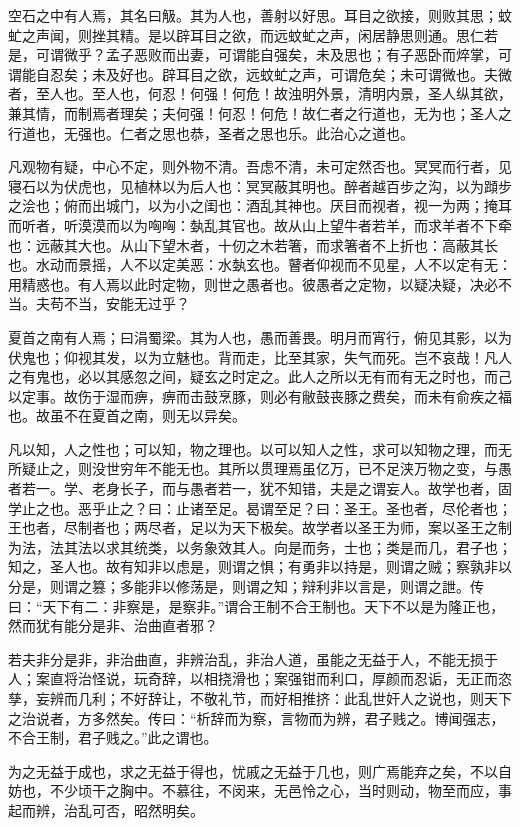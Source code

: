 \documentclass[]{article}
\begin{document}
空石之中有人焉，其名曰觙。其为人也，善射以好思。耳目之欲接，则败其思；蚊虻之声闻，则挫其精。是以辟耳目之欲，而远蚊虻之声，闲居静思则通。思仁若是，可谓微乎？孟子恶败而出妻，可谓能自强矣，未及思也；有子恶卧而焠掌，可谓能自忍矣；未及好也。辟耳目之欲，远蚊虻之声，可谓危矣；未可谓微也。夫微者，至人也。至人也，何忍！何强！何危！故浊明外景，清明内景，圣人纵其欲，兼其情，而制焉者理矣；夫何强！何忍！何危！故仁者之行道也，无为也；圣人之行道也，无强也。仁者之思也恭，圣者之思也乐。此治心之道也。

凡观物有疑，中心不定，则外物不清。吾虑不清，未可定然否也。冥冥而行者，见寝石以为伏虎也，见植林以为后人也：冥冥蔽其明也。醉者越百步之沟，以为蹞步之浍也；俯而出城门，以为小之闺也：酒乱其神也。厌目而视者，视一为两；掩耳而听者，听漠漠而以为哅哅：埶乱其官也。故从山上望牛者若羊，而求羊者不下牵也：远蔽其大也。从山下望木者，十仞之木若箸，而求箸者不上折也：高蔽其长也。水动而景摇，人不以定美恶：水埶玄也。瞽者仰视而不见星，人不以定有无：用精惑也。有人焉以此时定物，则世之愚者也。彼愚者之定物，以疑决疑，决必不当。夫苟不当，安能无过乎？

夏首之南有人焉；曰涓蜀梁。其为人也，愚而善畏。明月而宵行，俯见其影，以为伏鬼也；仰视其发，以为立魅也。背而走，比至其家，失气而死。岂不哀哉！凡人之有鬼也，必以其感忽之间，疑玄之时定之。此人之所以无有而有无之时也，而己以定事。故伤于湿而痹，痹而击鼓烹豚，则必有敝鼓丧豚之费矣，而未有俞疾之福也。故虽不在夏首之南，则无以异矣。

凡以知，人之性也；可以知，物之理也。以可以知人之性，求可以知物之理，而无所疑止之，则没世穷年不能无也。其所以贯理焉虽亿万，已不足浃万物之变，与愚者若一。学、老身长子，而与愚者若一，犹不知错，夫是之谓妄人。故学也者，固学止之也。恶乎止之？曰：止诸至足。曷谓至足？曰：圣王。圣也者，尽伦者也；王也者，尽制者也；两尽者，足以为天下极矣。故学者以圣王为师，案以圣王之制为法，法其法以求其统类，以务象效其人。向是而务，士也；类是而几，君子也；知之，圣人也。故有知非以虑是，则谓之惧；有勇非以持是，则谓之贼；察孰非以分是，则谓之篡；多能非以修荡是，则谓之知；辩利非以言是，则谓之詍。传曰：``天下有二：非察是，是察非。''谓合王制不合王制也。天下不以是为隆正也，然而犹有能分是非、治曲直者邪？

若夫非分是非，非治曲直，非辨治乱，非治人道，虽能之无益于人，不能无损于人；案直将治怪说，玩奇辞，以相挠滑也；案强钳而利口，厚颜而忍诟，无正而恣孳，妄辨而几利；不好辞让，不敬礼节，而好相推挤：此乱世奸人之说也，则天下之治说者，方多然矣。传曰：``析辞而为察，言物而为辨，君子贱之。博闻强志，不合王制，君子贱之。''此之谓也。

为之无益于成也，求之无益于得也，忧戚之无益于几也，则广焉能弃之矣，不以自妨也，不少顷干之胸中。不慕往，不闵来，无邑怜之心，当时则动，物至而应，事起而辨，治乱可否，昭然明矣。
\end{document}
